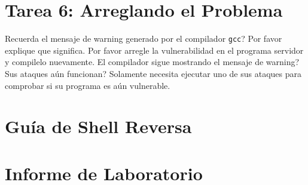 \section{Tarea 6: Arreglando el Problema}

Recuerda el mensaje de warning generado por el compilador \texttt{gcc}? Por favor explique que significa. Por favor arregle la vulnerabilidad en el programa servidor y compilelo nuevamente.
El compilador sigue mostrando el mensaje de warning? Sus ataques aún funcionan? Solamente necesita ejecutar uno de sus ataques para comprobar si su programa es aún vulnerable.


\section{Guía de Shell Reversa}
\label{sec:guildelines}






\section{Informe de Laboratorio}





